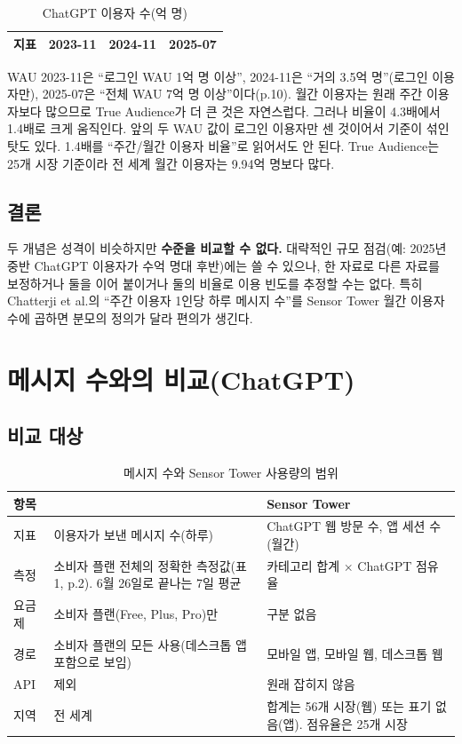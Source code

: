 \documentclass[11pt]{article}
\begin{document}
\begin{longtable}{L{7.4cm}R{2.4cm}R{2.4cm}R{2.4cm}}
\caption{ChatGPT 이용자 수(억 명)}\label{tab:tawau}\\
\toprule
지표 & 2023-11 & 2024-11 & 2025-07 \\
\midrule
\endhead

\bottomrule
\end{longtable}

WAU 2023-11은 ``로그인 WAU 1억 명 이상'', 2024-11은 ``거의 3.5억 명''(로그인 이용자만), 2025-07은 ``전체 WAU 7억 명 이상''이다(p.10). 월간 이용자는 원래 주간 이용자보다 많으므로 True Audience가 더 큰 것은 자연스럽다. 그러나 비율이 4.3배에서 1.4배로 크게 움직인다. 앞의 두 WAU 값이 로그인 이용자만 센 것이어서 기준이 섞인 탓도 있다. 1.4배를 ``주간/월간 이용자 비율''로 읽어서도 안 된다. True Audience는 25개 시장 기준이라 전 세계 월간 이용자는 9.94억 명보다 많다.

\subsection{결론}

두 개념은 성격이 비슷하지만 \textbf{수준을 비교할 수 없다.} 대략적인 규모 점검(예: 2025년 중반 ChatGPT 이용자가 수억 명대 후반)에는 쓸 수 있으나, 한 자료로 다른 자료를 보정하거나 둘을 이어 붙이거나 둘의 비율로 이용 빈도를 추정할 수는 없다. 특히 Chatterji et al.의 ``주간 이용자 1인당 하루 메시지 수''를 Sensor Tower 월간 이용자 수에 곱하면 분모의 정의가 달라 편의가 생긴다.

\section{\citeauthor{chatterji-2025-how-people-use-chatgpt} 메시지 수와의 비교(ChatGPT)}

\subsection{비교 대상}

\begin{longtable}{L{2.6cm}L{6.4cm}L{6.4cm}}
\caption{메시지 수와 Sensor Tower 사용량의 범위}\label{tab:chat-scope}\\
\toprule
항목 & \citeauthor{chatterji-2025-how-people-use-chatgpt} & Sensor Tower \\
\midrule
\endhead
지표 & 이용자가 보낸 메시지 수(하루) & ChatGPT 웹 방문 수, 앱 세션 수(월간) \\
측정 & 소비자 플랜 전체의 정확한 측정값(표 1, p.2). 6월 26일로 끝나는 7일 평균 & 카테고리 합계 $\times$ ChatGPT 점유율 \\
요금제 & 소비자 플랜(Free, Plus, Pro)만 & 구분 없음 \\
경로 & 소비자 플랜의 모든 사용(데스크톱 앱 포함으로 보임) & 모바일 앱, 모바일 웹, 데스크톱 웹 \\
API & 제외 & 원래 잡히지 않음 \\
지역 & 전 세계 & 합계는 56개 시장(웹) 또는 표기 없음(앱). 점유율은 25개 시장 \\
\bottomrule
\end{longtable}
\end{document}
